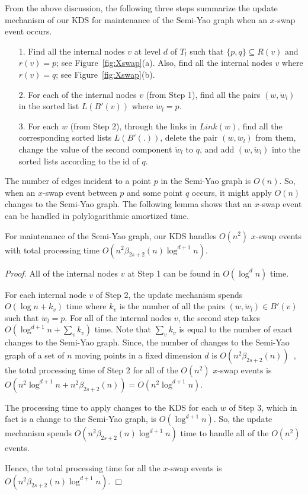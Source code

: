 \documentclass[11pt]{llncs}
\renewenvironment{proof}{\emph{Proof.}}{\hfill $\Box$ \medskip\\}
\begin{document}
From the above discussion, the following three steps summarize the update mechanism of our KDS for maintenance of the Semi-Yao graph when an $x$-swap event occurs.
\begin{itemize}
\item[1.] Find all the internal nodes $v$ at level $d$ of $T_l$ such that $\{p,q\}\subseteq R(v)$ and $r(v)=p$; see Figure~\ref{fig:Xswap}(a). Also, find all the internal nodes $v$ where $r(v)=q$; see Figure~\ref{fig:Xswap}(b).
\item[2.] For each of the internal nodes $v$ (from Step 1), find all the pairs $(w,\ddot{w}_l)$ in the sorted list $L(B'(v))$ where $\ddot{w}_l=p$.
\item[3.] For each $w$ (from Step 2), through the links in $Link(w)$, find all the corresponding sorted lists $L(B'(.))$, delete the pair $(w,\ddot{w}_l)$ from them, change the value of the second component $\ddot{w}_l$ to $q$, and add $(w,\ddot{w}_l)$ into the sorted lists according to the id of $q$.
\end{itemize}
The number of edges incident to a point $p$ in the Semi-Yao graph is $O(n)$. So, when an $x$-swap event between $p$ and some point $q$ occurs, it might apply $O(n)$ changes to the Semi-Yao graph. The following lemma shows that an $x$-swap event can be handled in polylogarithmic amortized time.
\begin{lemma}\label{the:Xswap}
For maintenance of the Semi-Yao graph, our KDS handles $O(n^2)$ $x$-swap events with total processing time $O(n^2\beta_{2s+2}(n)\log^{d+1} n)$.
\end{lemma}
\begin{proof} 
All of the internal nodes $v$ at Step 1 can be found in $O(\log^d n)$ time. 

For each internal node $v$ of Step 2, the update mechanism spends $O(\log n + k_v)$ time where $k_v$ is the number of all the pairs $(w,\ddot{w}_l)\in B'(v)$ such that $\ddot{w}_l=p$. For all of the internal nodes $v$, the second step takes $O(\log^{d+1} n + \sum_v k_v)$ time. Note that $\sum_v k_v$ is equal to the number of exact changes to the Semi-Yao graph. Since, the number of changes to the Semi-Yao graph of a set of $n$ moving points in a fixed dimension $d$ is $O(n^2\beta_{2s+2}(n))$~\cite{socg17-rahmati}, the total processing time of Step 2 for all of the $O(n^2)$ $x$-swap events is $O(n^2\log^{d+1} n + n^2\beta_{2s+2}(n))=O(n^2\log^{d+1} n)$. 

The processing time to apply changes to the KDS for each $w$ of Step 3, which in fact is a change to the Semi-Yao graph, is $O(\log^{d+1} n)$. So, the update mechanism spends $O(n^2\beta_{2s+2}(n)\log^{d+1} n)$ time to handle all of the $O(n^2)$ events.

Hence, the total processing time for all the $x$-swap events is $O(n^2\beta_{2s+2}(n)\log^{d+1} n)$.
\end{proof}
\end{document}
